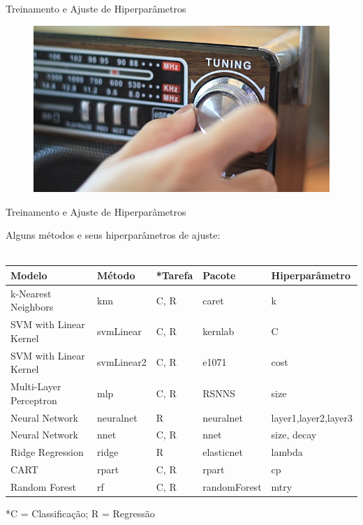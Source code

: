 \documentclass[12pt,ignorenonframetext,aspectratio=1610]{beamer}
\begin{document}
\begin{frame}[c]{Treinamento e Ajuste de Hiperparâmetros}
 
	\begin{figure}[H]
		\centering
		\includegraphics[scale=.6]{Fig/tuning.jpg}
	\end{figure}
	
\end{frame}

\begin{frame}[t]{Treinamento e Ajuste de Hiperparâmetros}

Alguns métodos e seus hiperparâmetros de ajuste: \\~\\

\begin{tabular}{@{}lllll@{}}
\toprule
\textbf{Modelo}          & \textbf{Método}   & \textbf{*Tarefa}    & \textbf{Pacote}       & \textbf{Hiperparâmetro} \\ \midrule
k-Nearest Neighbors     & knn               & C, R               & caret        & k                      \\
SVM with Linear Kernel  & svmLinear         & C, R   & kernlab      & C                      \\
SVM with Linear Kernel  & svmLinear2        & C, R   & e1071        & cost                   \\
Multi-Layer Perceptron  & mlp               & C, R   & RSNNS        & size                   \\
Neural Network          & neuralnet         & R      & neuralnet    & layer1,layer2,layer3   \\
Neural Network          & nnet              & C, R   & nnet         & size, decay            \\
Ridge Regression        & ridge             & R      & elasticnet   & lambda                 \\
CART                    & rpart             & C, R   & rpart        & cp                     \\
Random Forest           & rf                & C, R   & randomForest & mtry                   \\ \bottomrule
\end{tabular}
*C = Classificação; R = Regressão
\end{frame}
\end{document}
